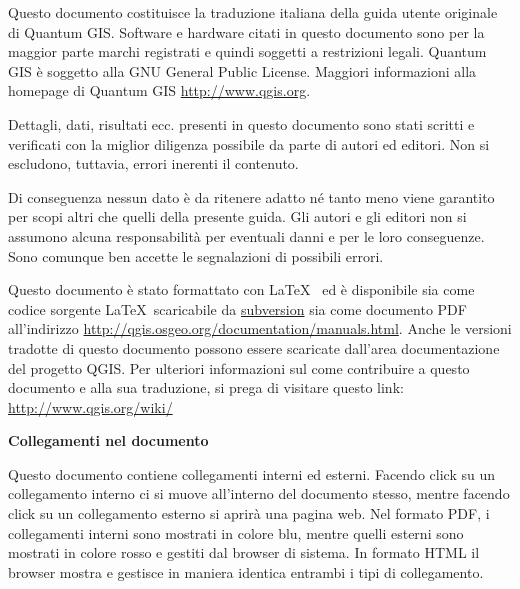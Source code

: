 \frontmatter
\pagestyle{scrplain}
\vspace{1cm}


Questo documento costituisce la traduzione italiana della guida utente originale di Quantum GIS.
Software e hardware citati in questo documento sono per la maggior parte marchi registrati e 
quindi soggetti a restrizioni legali. 
Quantum GIS è soggetto alla GNU General Public License. Maggiori informazioni 
alla homepage di Quantum GIS \url{http://www.qgis.org}.
\par\bigskip
Dettagli, dati, risultati ecc. presenti in questo documento sono stati scritti e verificati con la miglior
diligenza possibile da parte di autori ed editori. Non si escludono, tuttavia, errori inerenti il contenuto.
\par\bigskip
Di conseguenza nessun dato è da ritenere adatto né tanto meno viene garantito per scopi altri che quelli
della presente guida. 
Gli autori e gli editori non si assumono alcuna responsabilità per eventuali danni e per le
loro conseguenze. Sono comunque ben accette le segnalazioni di possibili errori.
\par\bigskip
Questo documento è stato formattato con \LaTeX~ ed è disponibile sia come codice sorgente \LaTeX~scaricabile 
da \href{http://wiki.qgis.org/qgiswiki/DocumentationWritersCorner}{subversion} 
sia come documento PDF all’indirizzo \url{http://qgis.osgeo.org/documentation/manuals.html}. 
Anche le versioni tradotte di questo documento possono essere scaricate dall'area 
documentazione del progetto QGIS. Per ulteriori informazioni sul come contribuire a questo 
documento e alla sua traduzione, si prega di visitare questo link: \url{http://www.qgis.org/wiki/} 

\vspace{1cm}
\noindent
\textbf{Collegamenti nel documento}
\par\bigskip
Questo documento contiene collegamenti interni ed esterni. Facendo click su un collegamento 
interno ci si muove all'interno del documento stesso, mentre facendo click su un collegamento 
esterno si aprirà una pagina web. Nel formato PDF, i collegamenti interni sono mostrati 
in colore blu, mentre quelli esterni sono mostrati in colore rosso e gestiti dal browser di sistema. 
In formato HTML il browser mostra e gestisce in maniera identica entrambi i tipi di collegamento.

